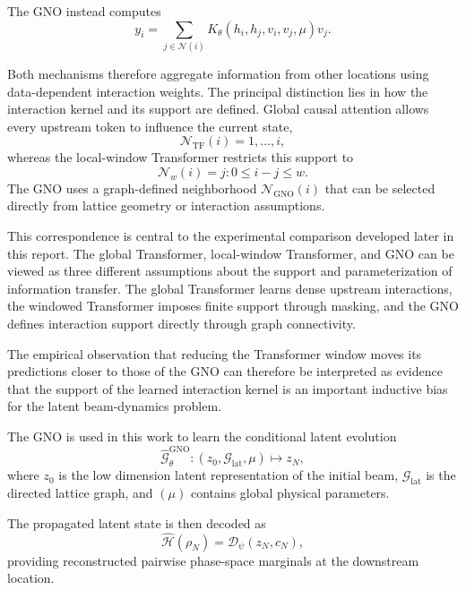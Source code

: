 The GNO instead computes
\begin{equation}
y_i
=
\sum_{j\in\mathcal{N}(i)}
K_{\theta}
\left(
h_i,
h_j,
v_i,
v_j,
\mu
\right)
v_j.
\label{eq:gno_kernel_sum}
\end{equation}

Both mechanisms therefore aggregate information from other locations using data-dependent interaction weights. The principal distinction lies in how the interaction kernel and its support are defined. Global causal attention allows every upstream token to influence the current state,
\begin{equation}
\mathcal{N}_{\mathrm{TF}}(i)
=
{1,\ldots,i},
\end{equation}
whereas the local-window Transformer restricts this support to
\begin{equation}
\mathcal{N}_{w}(i)
=
{
j:
0\le i-j\le w
}.
\end{equation}
The GNO uses a graph-defined neighborhood $\mathcal{N}_{\mathrm{GNO}}(i)$ that can be selected directly from lattice geometry or interaction assumptions.

This correspondence is central to the experimental comparison developed later in this report. The global Transformer, local-window Transformer, and GNO can be viewed as three different assumptions about the support and parameterization of information transfer. The global Transformer learns dense upstream interactions, the windowed Transformer imposes finite support through masking, and the GNO defines interaction support directly through graph connectivity.

The empirical observation that reducing the Transformer window moves its predictions closer to those of the GNO can therefore be interpreted as evidence that the support of the learned interaction kernel is an important inductive bias for the latent beam-dynamics problem.

The GNO is used in this work to learn the conditional latent evolution
\begin{equation}
\widehat{\mathcal{G}}_{\theta}^{\mathrm{GNO}}
:
(z_0,\mathcal{G}_{\mathrm{lat}},\mu)
\longmapsto
z_N,
\label{eq:gno_present_task}
\end{equation}
where $z_0$ is the low dimension latent representation of the initial beam, $\mathcal{G}_{\mathrm{lat}}$ is the directed lattice graph, and $(\mu)$ contains global physical parameters.

The propagated latent state is then decoded as
\begin{equation}
\widehat{\mathcal{H}}(\rho_N)
=
\mathcal{D}_{\psi}(z_N,c_N),
\label{eq:gno_decoding}
\end{equation}
providing reconstructed pairwise phase-space marginals at the downstream location.

